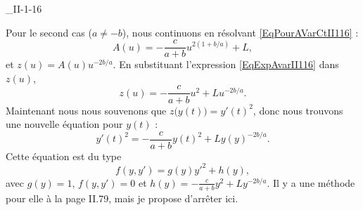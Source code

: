 \begin{corrige}{_II-1-16}
\begin{enumerate}
Pour le second cas ($a\neq -b$), nous continuons en résolvant \eqref{EqPourAVarCtII116} :
\begin{equation}		\label{EqExpAvarII116}
	A(u)=-\frac{ c }{ a+b }u^{2(1+b/a)}+L,
\end{equation}
et $z(u)=A(u)u^{-2b/a}$. En substituant l'expression \eqref{EqExpAvarII116} dans $z(u)$,
\begin{equation}
	z(u)=-\frac{ c }{ a+b }u^2+Lu^{-2b/a}.
\end{equation}
Maintenant nous nous souvenons que $z\big( y(t) \big)=y'(t)^2$, donc nous trouvons une nouvelle équation pour $y(t)$ :
\begin{equation}
	y'(t)^2=-\frac{ c }{ a+b }y(t)^2+Ly(y)^{-2b/a}.
\end{equation}
Cette équation est du type 
\begin{equation}
	f(y,y')=g(y)y'^2+h(y),
\end{equation}
avec $g(y)=1$, $f(y,y')=0$ et $h(y)=-\frac{ c }{ a+b }y^2+Ly^{-2b/a}$. Il y a une méthode pour elle à la page II.79, mais je propose d'arrêter ici.

\end{enumerate}
\end{corrige}
